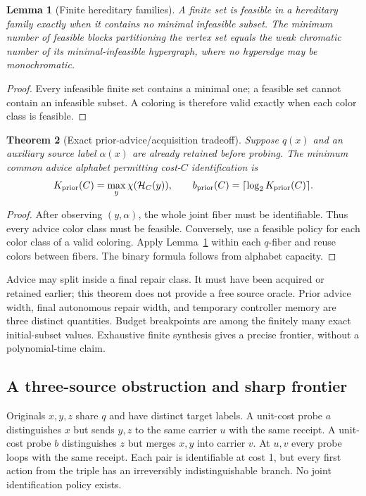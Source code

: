\documentclass[11pt]{article}
\newtheorem{theorem}{Theorem}[section]
\newtheorem{lemma}[theorem]{Lemma}
\theoremstyle{definition}
\begin{document}
\begin{lemma}[Finite hereditary families]\label{lem:hereditary}
A finite set is feasible in a hereditary family exactly when it contains no
minimal infeasible subset. The minimum number of feasible blocks partitioning
the vertex set equals the weak chromatic number of its minimal-infeasible
hypergraph, where no hyperedge may be monochromatic.
\end{lemma}
\begin{proof}
Every infeasible finite set contains a minimal one; a feasible set cannot
contain an infeasible subset. A coloring is therefore valid exactly when
each color class is feasible.
\end{proof}

\begin{theorem}[Exact prior-advice/acquisition tradeoff]
Suppose $q(x)$ and an auxiliary source label $\alpha(x)$ are already retained
before probing. The minimum common advice alphabet permitting cost-$C$
identification is
\[
 K_{\rm prior}(C)=\max_y\chi(\mathcal H_C(y)),\qquad
 b_{\rm prior}(C)=\lceil\log_2K_{\rm prior}(C)\rceil.
\]
\end{theorem}
\begin{proof}
After observing $(y,\alpha)$, the whole joint fiber must be identifiable.
Thus every advice color class must be feasible. Conversely, use a feasible
policy for each color class of a valid coloring. Apply
Lemma~\ref{lem:hereditary} within each $q$-fiber and reuse colors between
fibers. The binary formula follows from alphabet capacity.
\end{proof}

Advice may split inside a final repair class. It must have been acquired or
retained earlier; this theorem does not provide a free source oracle. Prior
advice width, final autonomous repair width, and temporary controller memory
are three distinct quantities. Budget breakpoints are among the finitely
many exact initial-subset values. Exhaustive finite synthesis gives a precise
frontier, without a polynomial-time claim.

\subsection*{A three-source obstruction and sharp frontier}
Originals $x,y,z$ share $q$ and have distinct target labels. A unit-cost probe
$a$ distinguishes $x$ but sends $y,z$ to the same carrier $u$ with the same
receipt. A unit-cost probe $b$ distinguishes $z$ but merges $x,y$ into carrier
$v$. At $u,v$ every probe loops with the same receipt. Each pair is identifiable
at cost 1, but every first action from the triple has an irreversibly
indistinguishable branch. No joint identification policy exists.
\end{document}
